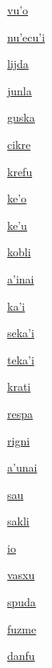 {\hyperlink{val:vuho}{vu'o}}{}{}{}

{\hyperlink{val:nuhecuhi}{nu'ecu'i}}{}{}{}

{\hyperlink{val:lijda}{lijda}}{}{}{}

{\hyperlink{val:junla}{junla}}{}{}{}

{\hyperlink{val:guska}{guska}}{}{}{}

{\hyperlink{val:cikre}{cikre}}{}{}{}

{\hyperlink{val:krefu}{krefu}}{}{}{}

{\hyperlink{val:keho}{ke'o}}{}{}{}

{\hyperlink{val:kehu}{ke'u}}{}{}{}

{\hyperlink{val:kobli}{kobli}}{}{}{}

{\hyperlink{val:ahinai}{a'inai}}{}{}{}

{\hyperlink{val:kahi}{ka'i}}{}{}{}

{\hyperlink{val:sekahi}{seka'i}}{}{}{}

{\hyperlink{val:tekahi}{teka'i}}{}{}{}

{\hyperlink{val:krati}{krati}}{}{}{}

{\hyperlink{val:respa}{respa}}{}{}{}

{\hyperlink{val:rigni}{rigni}}{}{}{}

{\hyperlink{val:ahunai}{a'unai}}{}{}{}

{\hyperlink{val:sau}{sau}}{}{}{}

{\hyperlink{val:sakli}{sakli}}{}{}{}

{\hyperlink{val:io}{io}}{}{}{}

{\hyperlink{val:vasxu}{vasxu}}{}{}{}

{\hyperlink{val:spuda}{spuda}}{}{}{}

{\hyperlink{val:fuzme}{fuzme}}{}{}{}

{\hyperlink{val:danfu}{danfu}}{}{}{}

